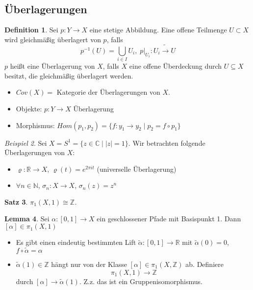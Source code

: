 \documentclass[a4paper, 12pt]{article}
\theoremstyle{plain}
\newtheorem{theorem}{Satz}[section] %
\theoremstyle{definition}
\newtheorem{definition}[theorem]{Definition} %
\theoremstyle{lemma}
\newtheorem{lemma}[theorem]{Lemma}
\theoremstyle{remark}
\theoremstyle{corollary}
\theoremstyle{example}
\newtheorem{example}[theorem]{Beispiel}
\begin{document}
	\subsection{Überlagerungen}
	\begin{definition}
		Sei $p:Y \to X$ eine stetige Abbildung. Eine offene Teilmenge $U \subset X$ wird gleichmäßig überlagert von $p$, falls \[p^{-1}(U) = \bigcup_{i \in I} U_i, \; p|_{U_i}: U_i \tilde{\to} U\] 
		$p$ heißt eine Überlagerung von $X$, falls $X$ eine offene Überdeckung durch $U \subseteq X$ besitzt, die gleichmäßig überlagert werden.\\
		\begin{itemize}
			\item $Cov(X)=$ Kategorie der Überlagerungen von $X$. 
			\item Objekte: $p:Y \to X$ Überlagerung
			\item Morphismus: $Hom(p_1,p_2) = \{f: y_1 \to y_2 \mid p_2 = f\circ p_1\}$
		\end{itemize}
	\end{definition}
	\begin{example}
		Sei $X=S^1 = \{z \in \mathbb{C} \mid \left|z\right| = 1\}$. Wir betrachten folgende Überlagerungen von $X$:
		\begin{itemize}
			\item $\varrho: \mathbb{R} \to X$, $\varrho(t) = e^{2\pi i t}$ (universelle Überlagerung)
			\item $\forall n \in \mathbb{N}$, $\sigma_n: X \to X$, $\sigma_n(z) = z^n$
		\end{itemize}
	\end{example}
	\begin{theorem}
		$\pi_1(X,1) \cong \mathbb{Z}$.
	\end{theorem}
	\begin{lemma}
		Sei $\alpha:[0,1] \to X$ ein geschlossener Pfade mit Basispunkt 1. Dann $[\alpha] \in \pi_1(X,1)$
		\begin{itemize}
			\item Es gibt einen eindeutig bestimmten Lift $\tilde{\alpha}: [0,1] \to \mathbb{R}$ mit $\tilde{\alpha}(0) = 0$, $f \circ \tilde{\alpha} = \alpha$
			\item $\tilde{\alpha}(1) \in \mathbb{Z}$ hängt nur von der Klasse $[\alpha] \in \pi_1(X,\mathbb{Z})$ ab. Definiere \[\pi_1(X, 1) \to \mathbb{Z}\] durch $[\alpha]\to \tilde{\alpha}(1)$. Z.z. das ist ein Gruppenisomorphismus.
		\end{itemize}
	\end{lemma}
\end{document}
